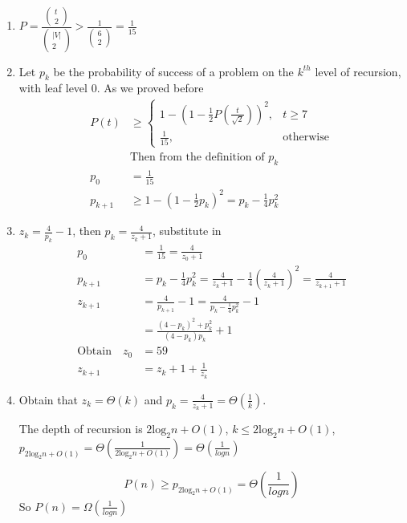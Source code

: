 \documentclass{assignment}
\begin{document}
    \maketitle

    \newpage

    \begin{homeworkProblem}
 \begin{enumerate}
\item $ P = \frac{\left( \begin{array}
{ccc}
t \\
2 
\end{array}\right)}{\left( \begin{array}
{ccc}
|V| \\
2 
\end{array}\right)} > \frac{1}{\left( \begin{array}
{ccc}
6 \\
2 
\end{array}\right)} = \frac{1}{15} $ 
\item  Let $p_k$ be the probability of success of a problem on the $k^{th}$ level of recursion, with leaf level $0$. As we proved before 
\begin{align*} 
P(t) &\geq \begin{cases}
 1 - (1-\frac{1}{2}P(\frac{t}{\sqrt{2}}))^2, & t \geq 7 \\[2ex] 
\frac{1}{15},& \text{otherwise}
\end{cases} \\[3ex]
&\text{Then from the definition of } p_k  \\
p_0 &= \frac{1}{15} \\
p_{k+1} &\geq 1 - (1 - \frac{1}{2}p_k)^2 = p_k - \frac{1}{4}p_k^2
\end{align*}

\item $z_k = \frac{4}{p_k} - 1$, then $p_k = \frac{4}{z_k + 1}$, substitute in 
\begin{align*}
p_0 &= \frac{1}{15} = \frac{4}{z_0 + 1} \\
p_{k+1} &= p_k - \frac{1}{4}p_k^2 = \frac{4}{z_k + 1} - \frac{1}{4}(\frac{4}{z_k + 1})^2 = \frac{4}{z_{k+1} + 1} \\[2ex] 
z_{k+1} &= \frac{4}{p_{k+1}} - 1 = \frac{4}{p_k - \frac{1}{4}p_k^2} - 1 \\ 
&= \frac{(4-p_k)^2 + p_k^2}{(4-p_k)p_k} + 1\\[3ex]
\text{Obtain}  \quad
z_0 &= 59 \\
z_{k+1} &= z_k + 1 + \frac{1}{z_k}
\end{align*}
\item Obtain that $z_k=\Theta(k)$ and $p_k=\frac{4}{z_k + 1} = \Theta(\frac{1}{k})$.

The depth of recursion is $2\text{log}_2n + O(1)$, $k\leq 2\text{log}_2n + O(1)$, $p_{2\text{log}_2n + O(1)} = \Theta (\frac{1}{2\text{log}_2n + O(1)}) =  \Theta (\frac{1}{logn})$

$$P(n) \geq p_{2\text{log}_2n + O(1)} = \Theta(\frac{1}{logn})$$
 So $P(n) = \Omega (\frac{1}{logn})$
\end{enumerate}    
    
    
    \end{homeworkProblem}
	
\end{document}

